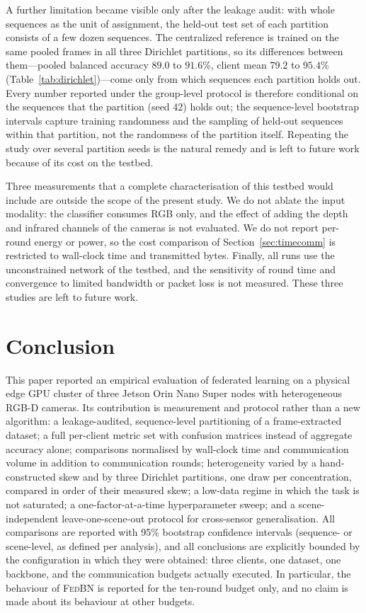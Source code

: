\documentclass[journal]{IEEEtran}
\newcommand{\fedbn}{\textsc{FedBN}}
\begin{document}
A further limitation became visible only after the leakage audit: with whole sequences as the unit of assignment, the held-out test set of each partition consists of a few dozen sequences. The centralized reference is trained on the same pooled frames in all three Dirichlet partitions, so its differences between them---pooled balanced accuracy $89.0$ to $91.6$\%, client mean $79.2$ to $95.4$\% (Table~\ref{tab:dirichlet})---come only from which sequences each partition holds out. Every number reported under the group-level protocol is therefore conditional on the sequences that the partition (seed 42) holds out; the sequence-level bootstrap intervals capture training randomness and the sampling of held-out sequences within that partition, not the randomness of the partition itself. Repeating the study over several partition seeds is the natural remedy and is left to future work because of its cost on the testbed.

Three measurements that a complete characterisation of this testbed would include are outside the scope of the present study. We do not ablate the input modality: the classifier consumes RGB only, and the effect of adding the depth and infrared channels of the cameras is not evaluated. We do not report per-round energy or power, so the cost comparison of Section~\ref{sec:timecomm} is restricted to wall-clock time and transmitted bytes. Finally, all runs use the unconstrained network of the testbed, and the sensitivity of round time and convergence to limited bandwidth or packet loss is not measured. These three studies are left to future work.


\section{Conclusion}
\label{sec:conclusion}

This paper reported an empirical evaluation of federated learning on a physical edge GPU cluster of three Jetson Orin Nano Super nodes with heterogeneous RGB-D cameras. Its contribution is measurement and protocol rather than a new algorithm: a leakage-audited, sequence-level partitioning of a frame-extracted dataset; a full per-client metric set with confusion matrices instead of aggregate accuracy alone; comparisons normalised by wall-clock time and communication volume in addition to communication rounds; heterogeneity varied by a hand-constructed skew and by three Dirichlet partitions, one draw per concentration, compared in order of their measured skew; a low-data regime in which the task is not saturated; a one-factor-at-a-time hyperparameter sweep; and a scene-independent leave-one-scene-out protocol for cross-sensor generalisation. All comparisons are reported with 95\% bootstrap confidence intervals (sequence- or scene-level, as defined per analysis), and all conclusions are explicitly bounded by the configuration in which they were obtained: three clients, one dataset, one backbone, and the communication budgets actually executed. In particular, the behaviour of \fedbn{} is reported for the ten-round budget only, and no claim is made about its behaviour at other budgets.
\end{document}
